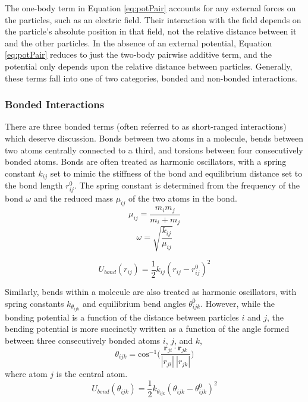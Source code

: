 The one-body term in Equation \eqref{eq:potPair} accounts for any
external forces on the particles, such as an electric field. Their
interaction with the field depends on the particle's absolute position
in that field, not the relative distance between it and the other
particles. In the absence of an external potential, Equation
\eqref{eq:potPair} reduces to just the two-body pairwise additive
term, and the potential only depends upon the relative distance
between particles. Generally, these terms fall into one of two
categories, bonded and non-bonded interactions.

\subsubsection{Bonded Interactions}
There are three bonded terms (often referred to as short-ranged
interactions) which deserve discussion. Bonds between two atoms in a
molecule, bends between two atoms centrally connected to a third, and
torsions between four consecutively bonded atoms. Bonds are often
treated as harmonic oscillators, with a spring constant $k_{ij}$ set
to mimic the stiffness of the bond and equilibrium distance set to the
bond length $r_{ij}^0$. The spring constant is determined from the
frequency of the bond $\omega$ and the reduced mass $\mu_{ij}$ of the
two atoms in the bond.
\begin{equation}
\mu_{ij} = \frac{m_i m_j}{m_i + m_j}
\end{equation}
\begin{equation}\label{eq:kij}
\omega = \sqrt{\frac{k_{ij}}{\mu_{ij}} }
\end{equation}

\begin{equation}\label{eq:bonds}
U_{bond}(r_{ij}) = \frac{1}{2} k_{ij} (r_{ij} -r_{ij}^0)^2
\end{equation}

Similarly, bends within a molecule are also treated as harmonic
oscillators, with spring constants $k_{\theta_{ijk}}$ and equilibrium bend
angles $\theta_{ijk}^0$. However, while the bonding potential is a
function of the distance between particles $i$ and $j$, the bending
potential is more succinctly written as a function of the angle formed between three
consecutively bonded atoms $i$, $j$, and $k$,
\begin{equation}\label{eq:bend}
\theta_{ijk} = \mathrm{cos}^{-1}\Bigg(\frac{\mathbf{r}_{ji} \cdot
  \mathbf{r}_{jk}}{|r_{ji}|~|r_{jk}|}\Bigg)
\end{equation}
where atom $j$ is the central atom. 
\begin{equation}\label{eq:bend2}
U_{bend}(\theta_{ijk}) = \frac{1}{2} k_{\theta_{ijk}} (\theta_{ijk} -
\theta_{ijk}^0)^2
\end{equation}

